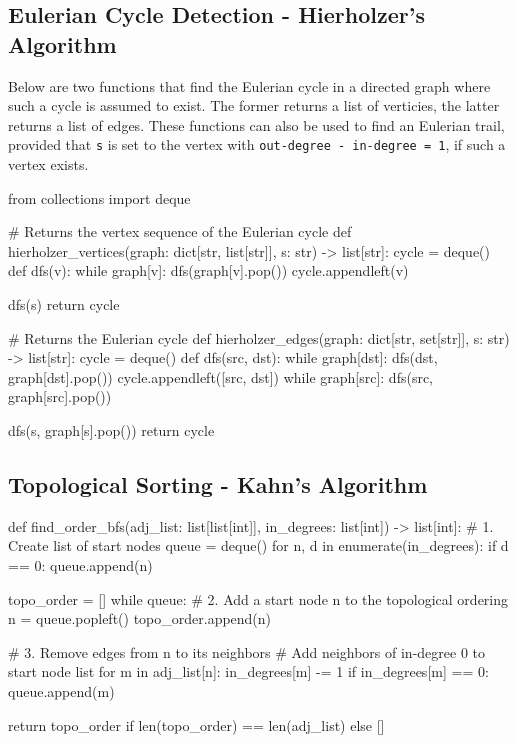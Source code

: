 \documentclass[12pt, titlepage]{article}
\begin{document}
\subsection{Eulerian Cycle Detection - Hierholzer's Algorithm}

Below are two functions that find the Eulerian cycle in a directed graph where such a cycle is assumed to exist. The former returns a list of verticies, the latter returns a list of edges. These functions can also be used to find an Eulerian trail, provided that \texttt{s} is set to the vertex with \texttt{out-degree - in-degree = 1}, if such a vertex exists. \medskip

\begin{python}
from collections import deque

# Returns the vertex sequence of the Eulerian cycle
def hierholzer_vertices(graph: dict[str, list[str]], s: str) -> list[str]:
    cycle = deque()
    def dfs(v):
        while graph[v]:
            dfs(graph[v].pop())
        cycle.appendleft(v)

    dfs(s)
    return cycle


# Returns the Eulerian cycle
def hierholzer_edges(graph: dict[str, set[str]], s: str) -> list[str]:
    cycle = deque()
    def dfs(src, dst):
        while graph[dst]:
            dfs(dst, graph[dst].pop())
        cycle.appendleft([src, dst])
        while graph[src]:
            dfs(src, graph[src].pop())

    dfs(s, graph[s].pop())
    return cycle
\end{python}

\subsection{Topological Sorting - Kahn's Algorithm}
\begin{python}
def find_order_bfs(adj_list: list[list[int]],
                   in_degrees: list[int]) -> list[int]:
    # 1. Create list of start nodes
    queue = deque()
    for n, d in enumerate(in_degrees):
        if d == 0:
            queue.append(n)

    topo_order = []
    while queue:
        # 2. Add a start node n to the topological ordering
        n = queue.popleft()
        topo_order.append(n)

        # 3. Remove edges from n to its neighbors
        #    Add neighbors of in-degree 0 to start node list
        for m in adj_list[n]:
            in_degrees[m] -= 1
            if in_degrees[m] == 0:
                queue.append(m)

    return topo_order if len(topo_order) == len(adj_list) else []
\end{python}
\end{document}
